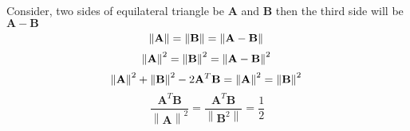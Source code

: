 \documentclass[journal,12pt,twocolumn]{IEEEtran}
\providecommand{\norm}[1]{\left\lVert#1\right\rVert}
\let\vec\mathbf
\providecommand{\brak}[1]{\ensuremath{\left(#1\right)}}
\begin{document}
%
%

\noindent Consider, two sides of equilateral triangle be $\vec{A}$ and $\vec{B}$ then the third side will be $ \vec{A} -\vec{B}$ 
\begin{equation}
\norm{\vec{A}}=\norm{\vec{B}}=\norm{\vec{A-B}}\\
\end{equation}
\begin{equation}
\norm{\vec{A}}^2=\norm{\vec{B}}^2=\norm{\vec{A-B}}^2\\
\end{equation}
\begin{equation}
\norm{\vec{A}}^2+\norm{\vec{B}}^2-2\vec{A}^T\vec{B}=\norm{\vec{A}}^2=\norm{\vec{B}}^2\\
\end{equation}
\begin{equation}
\frac{\vec{A}^T\vec{B}}{\norm{\vec{A}}^2}=\frac{\vec{A}^T\vec{B}}{\norm{\vec{B}^2}}=\frac{1}{2}
\end{equation}
\end{document}
